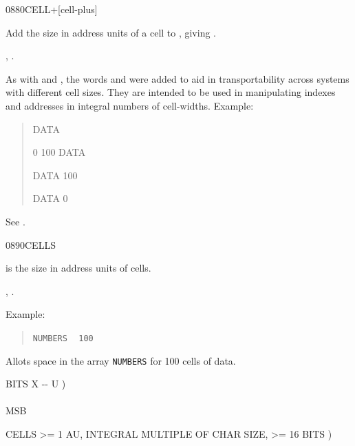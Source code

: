 \begin{worddef}{0880}{CELL+}[cell-plus]
\item {}

	Add the size in address units of a cell to , giving
	.

\see {},
	.

	\begin{rationale} %
		As with  and , the words 
		and  were added to aid in transportability across
		systems with different cell sizes. They are intended to be used
		in manipulating indexes and addresses in integral numbers of
		cell-widths. Example:
		\begin{quote}\ttfamily
			 DATA

			0 100 DATA 

			DATA   100

			DATA    0
		\end{quote}
	\end{rationale}

	\begin{testing} %
		See .
	\end{testing}
\end{worddef}


\begin{worddef}{0890}{CELLS}
\item {}

	 is the size in address units of  cells.

\see {}, .

	\begin{rationale} %
		Example:
		\begin{quote}
			 \texttt{NUMBERS} ~
			\texttt{100}  
		\end{quote}
		Allots space in the array \texttt{NUMBERS} for 100 cells
		of data.
	\end{rationale}

	\begin{testing} %
		\ttfamily
		\word{:} BITS  X -{}- U ) \\
		     \\
		\tab[2]  MSB        \\
		\tab {} 
		\word{;}

		 CELLS >= 1 AU, INTEGRAL MULTIPLE OF CHAR SIZE, >= 16 BITS ) \\
		 \\
		 \\
	\end{testing}
\end{worddef}


